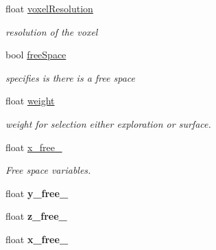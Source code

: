 \begin{DoxyCompactItemize}
\item 
float \hyperlink{classPMVolumetric_a964eeed54985873d2735dcf2380127a1}{voxel\+Resolution}\hypertarget{classPMVolumetric_a964eeed54985873d2735dcf2380127a1}{}\label{classPMVolumetric_a964eeed54985873d2735dcf2380127a1}

\begin{DoxyCompactList}\small\item\em resolution of the voxel \end{DoxyCompactList}\item 
bool \hyperlink{classPMVolumetric_a2e29abf9993484d2bbbcd4bebb88bb5b}{free\+Space}\hypertarget{classPMVolumetric_a2e29abf9993484d2bbbcd4bebb88bb5b}{}\label{classPMVolumetric_a2e29abf9993484d2bbbcd4bebb88bb5b}

\begin{DoxyCompactList}\small\item\em specifies is there is a free space \end{DoxyCompactList}\item 
float \hyperlink{classPMVolumetric_aeb6f8ce9035c1c8b69f520477e8ab600}{weight}\hypertarget{classPMVolumetric_aeb6f8ce9035c1c8b69f520477e8ab600}{}\label{classPMVolumetric_aeb6f8ce9035c1c8b69f520477e8ab600}

\begin{DoxyCompactList}\small\item\em weight for selection either exploration or surface. \end{DoxyCompactList}\item 
float \hyperlink{classPMVolumetric_a4686f6c4059450e2121d7a44aeb8b3d0}{x\+\_\+free\+\_}\hypertarget{classPMVolumetric_a4686f6c4059450e2121d7a44aeb8b3d0}{}\label{classPMVolumetric_a4686f6c4059450e2121d7a44aeb8b3d0}

\begin{DoxyCompactList}\small\item\em Free space variables. \end{DoxyCompactList}\item 
float {\bfseries y\+\_\+free\+\_}\hypertarget{classPMVolumetric_a34013864d3c62a900cbffe47e4b3f7ea}{}\label{classPMVolumetric_a34013864d3c62a900cbffe47e4b3f7ea}

\item 
float {\bfseries z\+\_\+free\+\_}\hypertarget{classPMVolumetric_a7a33808dfb5502146199f40baa5d7971}{}\label{classPMVolumetric_a7a33808dfb5502146199f40baa5d7971}

\item 
float {\bfseries x\+\_\+free\+\_}\hypertarget{classPMVolumetric_a885951c2ae3460208a4c2bbd4dbd5f21}{}\label{classPMVolumetric_a885951c2ae3460208a4c2bbd4dbd5f21}


\end{DoxyCompactItemize}
